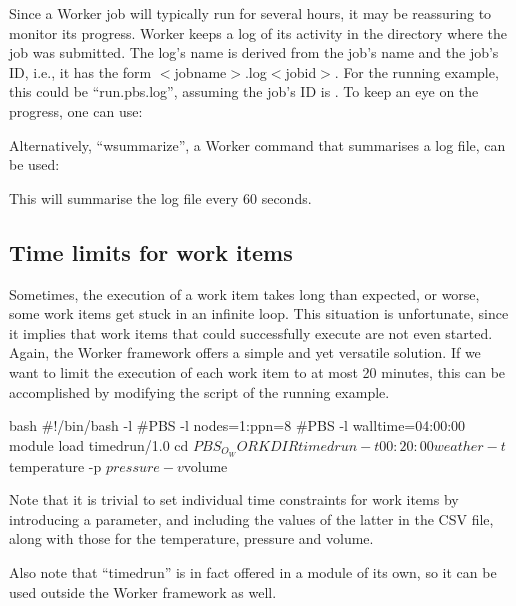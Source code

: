 Since a Worker job will typically run for several hours, it may be reassuring
to monitor its progress. Worker keeps a log of its activity in the directory
where the job was submitted. The log's name is derived from the job's name and
the job's ID, i.e., it has the form $<$jobname$>$.log$<$jobid$>$. For the
running example, this could be ``run.pbs.log\jobnumber'', assuming the job's ID is
\jobnumber. To keep an eye on the progress, one can use:

\begin{prompt}
\end{prompt}

Alternatively, ``wsummarize'', a Worker command that summarises a log file, can be used:

\begin{prompt}
\end{prompt}

This will summarise the log file every 60 seconds.

\subsection{Time limits for work items}

Sometimes, the execution of a work item takes long than expected, or worse,
some work items get stuck in an infinite loop. This situation is unfortunate,
since it implies that work items that could successfully execute are not even
started. Again, the Worker framework offers a simple and yet versatile
solution. If we want to limit the execution of each work item to at most 20
minutes, this can be accomplished by modifying the script of the running
example.

\begin{code}{bash}
#!/bin/bash -l
#PBS -l nodes=1:ppn=8
#PBS -l walltime=04:00:00
module load timedrun/1.0
cd $PBS_O_WORKDIR
timedrun -t 00:20:00 weather -t $temperature  -p $pressure  -v $volume
\end{code}

Note that it is trivial to set individual time constraints for work items by
introducing a parameter, and including the values of the latter in the CSV
file, along with those for the temperature, pressure and volume.

Also note that ``timedrun'' is in fact offered in a module of its own, so it can
be used outside the Worker framework as well.

